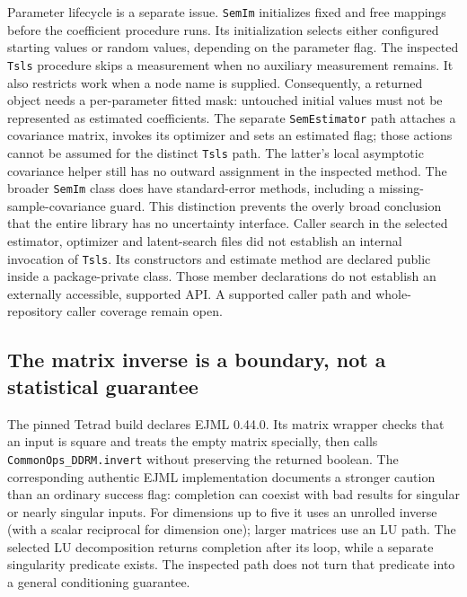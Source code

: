 Parameter lifecycle is a separate issue. \texttt{SemIm} initializes fixed and free mappings before the coefficient procedure runs. Its initialization selects either configured starting values or random values, depending on the parameter flag. The inspected \texttt{Tsls} procedure skips a measurement when no auxiliary measurement remains. It also restricts work when a node name is supplied. Consequently, a returned object needs a per-parameter fitted mask: untouched initial values must not be represented as estimated coefficients. The separate \texttt{SemEstimator} path attaches a covariance matrix, invokes its optimizer and sets an estimated flag; those actions cannot be assumed for the distinct \texttt{Tsls} path. The latter's local asymptotic covariance helper still has no outward assignment in the inspected method. The broader \texttt{SemIm} class does have standard-error methods, including a missing-sample-covariance guard. This distinction prevents the overly broad conclusion that the entire library has no uncertainty interface. Caller search in the selected estimator, optimizer and latent-search files did not establish an internal invocation of \texttt{Tsls}. Its constructors and estimate method are declared public inside a package-private class. Those member declarations do not establish an externally accessible, supported API. A supported caller path and whole-repository caller coverage remain open.~\citep{exec25_javaiv_tetrad,exec22_java_latent_iv_preflight}

\subsection{The matrix inverse is a boundary, not a statistical guarantee}

The pinned Tetrad build declares EJML 0.44.0. Its matrix wrapper checks that an input is square and treats the empty matrix specially, then calls \texttt{CommonOps\_DDRM.invert} without preserving the returned boolean. The corresponding authentic EJML implementation documents a stronger caution than an ordinary success flag: completion can coexist with bad results for singular or nearly singular inputs. For dimensions up to five it uses an unrolled inverse (with a scalar reciprocal for dimension one); larger matrices use an LU path. The selected LU decomposition returns completion after its loop, while a separate singularity predicate exists. The inspected path does not turn that predicate into a general conditioning guarantee.~\citep{exec25_javaiv_tetrad,exec25_javaiv_ejml}

